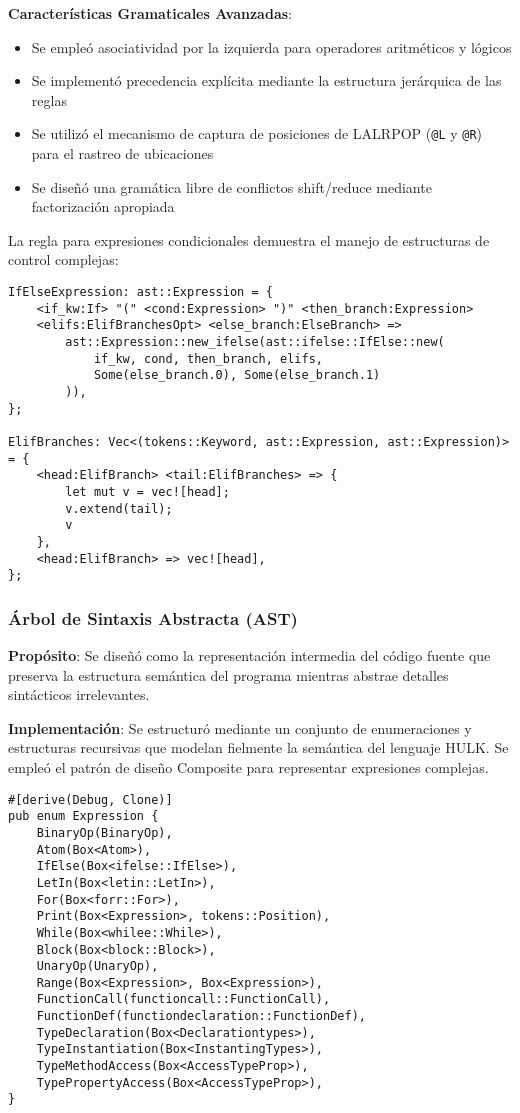 \documentclass[12pt,a4paper]{article}
\begin{document}
\textbf{Características Gramaticales Avanzadas}:
\begin{itemize}
    \item Se empleó asociatividad por la izquierda para operadores aritméticos y lógicos
    \item Se implementó precedencia explícita mediante la estructura jerárquica de las reglas
    \item Se utilizó el mecanismo de captura de posiciones de LALRPOP (\texttt{@L} y \texttt{@R}) para el rastreo de ubicaciones
    \item Se diseñó una gramática libre de conflictos shift/reduce mediante factorización apropiada
\end{itemize}

La regla para expresiones condicionales demuestra el manejo de estructuras de control complejas:

\begin{lstlisting}[style=lalrpop,caption=Manejo de estructuras condicionales]
IfElseExpression: ast::Expression = {
    <if_kw:If> "(" <cond:Expression> ")" <then_branch:Expression>
    <elifs:ElifBranchesOpt> <else_branch:ElseBranch> =>
        ast::Expression::new_ifelse(ast::ifelse::IfElse::new(
            if_kw, cond, then_branch, elifs,
            Some(else_branch.0), Some(else_branch.1)
        )),
};

ElifBranches: Vec<(tokens::Keyword, ast::Expression, ast::Expression)> = {
    <head:ElifBranch> <tail:ElifBranches> => {
        let mut v = vec![head];
        v.extend(tail);
        v
    },
    <head:ElifBranch> => vec![head],
};
\end{lstlisting}

\subsubsection{Árbol de Sintaxis Abstracta (AST)}

\textbf{Propósito}: Se diseñó como la representación intermedia del código fuente que preserva la estructura semántica del programa mientras abstrae detalles sintácticos irrelevantes.

\textbf{Implementación}: Se estructuró mediante un conjunto de enumeraciones y estructuras recursivas que modelan fielmente la semántica del lenguaje HULK. Se empleó el patrón de diseño Composite para representar expresiones complejas.

\begin{lstlisting}[style=rustcode,caption=Definición del AST principal]
#[derive(Debug, Clone)]
pub enum Expression {
    BinaryOp(BinaryOp),
    Atom(Box<Atom>),
    IfElse(Box<ifelse::IfElse>),
    LetIn(Box<letin::LetIn>),
    For(Box<forr::For>),
    Print(Box<Expression>, tokens::Position),
    While(Box<whilee::While>),
    Block(Box<block::Block>),
    UnaryOp(UnaryOp),
    Range(Box<Expression>, Box<Expression>),
    FunctionCall(functioncall::FunctionCall),
    FunctionDef(functiondeclaration::FunctionDef),
    TypeDeclaration(Box<Declarationtypes>),
    TypeInstantiation(Box<InstantingTypes>),
    TypeMethodAccess(Box<AccessTypeProp>),
    TypePropertyAccess(Box<AccessTypeProp>),
}
\end{lstlisting}
\end{document}
